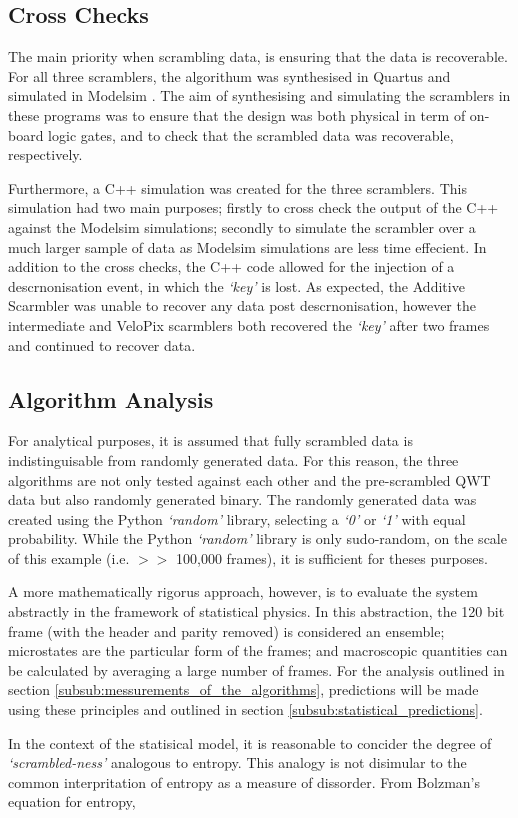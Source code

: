 	\subsection{Cross Checks} %
	\label{sub:cross_checks}
		The main priority when scrambling data, is ensuring that the data is recoverable.
		For all three scramblers, the algorithum was synthesised in Quartus \cite{ref:quartus} and simulated in Modelsim \cite{ref:modelsim}.
		The aim of synthesising and simulating the scramblers in these programs was to ensure that the design was both physical in term of on-board logic gates, and to check that the scrambled data was recoverable, respectively.
		\par
		Furthermore, a C++ simulation was created for the three scramblers.
		This simulation had two main purposes;
		firstly to cross check the output of the C++ against the Modelsim simulations;
		secondly to simulate the scrambler over a much larger sample of data as Modelsim simulations are less time effecient.
		In addition to the cross checks, the C++ code allowed for the injection of a descrnonisation event, in which the \textit{`key'} is lost.
		As expected, the Additive Scarmbler was unable to recover any data post descrnonisation, however the intermediate and VeloPix scarmblers both recovered the \textit{`key'} after two frames and continued to recover data.


	\subsection{Algorithm Analysis}
	\label{sub:algorithm_analysis}

		For analytical purposes, it is assumed that fully scrambled data is indistinguisable from randomly generated data. 
		For this reason, the three algorithms are not only tested against each other and the pre-scrambled QWT data but also randomly generated binary.
		The randomly generated data was created using the Python \textit{`random'} library, selecting a \textit{`0'} or \textit{`1'} with equal probability.
		While the Python \textit{`random'} library is only sudo-random, on the scale of this example (i.e. $>>$ 100,000 frames), it is sufficient for theses purposes.
		\par
		A more mathematically rigorus approach, however, is to evaluate the system abstractly in the framework of statistical physics.
		In this abstraction, the 120 bit frame (with the header and parity removed)  is considered an ensemble; 
		microstates are the particular form of the frames;
		and macroscopic quantities can be calculated by averaging a large number of frames.
		For the analysis outlined in section \ref{subsub:messurements_of_the_algorithms}, predictions will be made using these principles and outlined in section \ref{subsub:statistical_predictions}.
		\par
		In the context of the statisical model, it is reasonable to concider the degree of \textit{`scrambled-ness'} analogous to entropy.	This analogy is not disimular to the common interpritation of entropy as a measure of dissorder. From Bolzman's equation for entropy,

